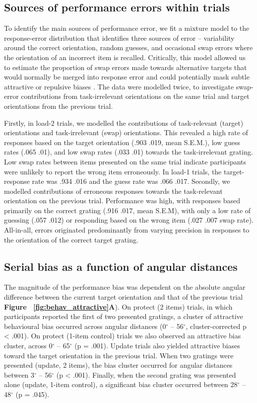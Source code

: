 \documentclass{article}
\begin{document}
\subsection*{Sources of performance errors within trials}
To identify the main sources of performance error, we fit a mixture model to the response-error distribution \parencite{Bays2009} that identifies three sources of error – variability around the correct orientation, random guesses, and occasional swap errors where the orientation of an incorrect item is recalled. Critically, this model allowed us to estimate the proportion of swap errors made towards alternative targets that would normally be merged into response error and could potentially mask subtle attractive or repulsive biases \parencite{Huang2020}. The data were modelled twice, to investigate swap-error contributions from task-irrelevant orientations on the same trial and target orientations from the previous trial.

Firstly, in load-2 trials, we modelled the contributions of task-relevant (target) orientations and task-irrelevant (swap) orientations. This revealed a high rate of responses based on the target orientation (.903 \textpm .019, mean \textpm S.E.M.), low guess rates (.065 \textpm .01), and low swap rates (.033 \textpm .01) towards the task-irrelevant grating. Low swap rates between items presented on the same trial indicate participants were unlikely to report the wrong item erroneously. In load-1 trials, the target-response rate was .934 \textpm .016 and the guess rate was .066 \textpm .017. Secondly, we modelled contributions of erroneous responses towards the task-relevant orientation on the previous trial. Performance was high, with responses based primarily on the correct grating (.916 \textpm .017, mean \textpm S.E.M), with only a low rate of guessing (.057 \textpm .012) or responding based on the wrong item (.027 \textpm .007 swap rate). All-in-all, errors originated predominantly from varying precision in responses to the orientation of the correct target grating.

\subsection*{Serial bias as a function of angular distances}
The magnitude of the performance bias was dependent on the absolute angular difference between the current target orientation and that of the previous trial \textbf{Figure ~\ref{fig:behav_attractive}A}). On protect (2 items) trials, in which participants reported the first of two presented gratings, a cluster of attractive behavioural bias occurred across angular distances (0$^{\circ}$ – 56$^{\circ}$, cluster-corrected p < .001). On protect (1-item control) trials we also observed an attractive bias cluster, across 0$^{\circ}$ – 65$^{\circ}$ (p = .001).  Update trials also yielded attractive biases toward the target orientation in the previous trial. When two gratings were presented (update, 2 items), the bias cluster occurred for angular distances between 3$^{\circ}$ – 56$^{\circ}$ (p < .001). Finally, when the second grating was presented alone (update, 1-item control), a significant bias cluster occurred between 28$^{\circ}$ – 48$^{\circ}$ (p = .045).
\end{document}
